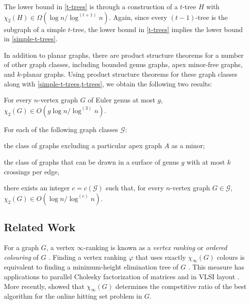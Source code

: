 \documentclass[kpfonts]{patmorin}
\newcommand{\trn}{\chi_2}
\theoremstyle{named}
\begin{document}
The lower bound in \cref{t-trees} is through a construction of a $t$-tree $H$ with
$\trn(H)\in\Omega(\log n/\log^{(t+1)} n)$.  Again, since every $(t-1)$-tree is the subgraph of a simple $t$-tree, the lower bound in \cref{t-trees} implies the lower bound in \cref{simple-t-trees}.

In addition to planar graphs, there are product structure theorems for a number of other graph classes, including bounded genus graphs, apex minor-free graphs, and $k$-planar graphs.  Using product structure theorems for these graph classes along with \cref{simple-t-trees,t-trees}, we obtain the following two results:

\begin{thm}\label{bounded-genus}
    For every $n$-vertex graph $G$ of Euler genus at most $g$, $\trn(G)\in O(g\log n/\log^{(3)} n)$.
\end{thm}

\begin{thm}\label{meta-theorem}\label{meta}
    For each of the following graph classes $\mathcal{G}$:
    \begin{compactenum}
        \item the class of graphs excluding a particular apex graph $A$ as a minor;
        \item the class of graphs that can be drawn in a surface of genus $g$ with at most $k$ crossings per edge,
    \end{compactenum}
    there exists an integer $c=c(\mathcal{G})$ such that, for every $n$-vertex graph $G\in\mathcal{G}$, $\trn(G)\in O(\log n/\log^{(c)} n)$.
\end{thm}

\subsection{Related Work}

For a graph $G$, a vertex $\infty$-ranking is known as a \emph{vertex ranking} \cite{bodlaender.deogun.ea:rankings} or \emph{ordered colouring} of $G$ \cite{katchalski.mccuaig.ea:ordered}.  Finding a vertex ranking $\varphi$ that uses exactly $\chi_\infty(G)$ colours is equivalent to finding a minimum-height elimination tree of $G$ \cite{torre.greenlaw.ea:optimal,deogun.kloks.ea:on}.  This measure has applications to parallel Cholesky factorization of matrices \cite{bodlaender.gilbert.ea:approximating,duff.reid:multifrontal,liu:role,dereniowski.kubale:cholesky} and in VLSI layout \cite{leiserson:area,sen.deng.ea:on}.  More recently, \citet{even.smorodinsky:hitting} showed that $\chi_\infty(G)$ determines the competitive ratio of the best algorithm for the online hitting set problem in $G$.
\end{document}
